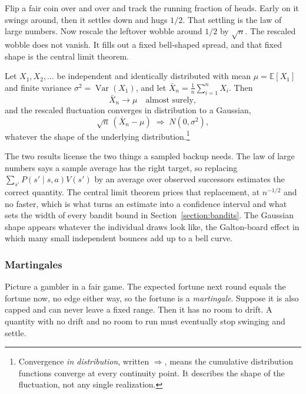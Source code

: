 Flip a fair coin over and over and track the running fraction of heads. Early on it swings around, then it settles down and hugs $1/2$. That settling is the law of large numbers. Now rescale the leftover wobble around $1/2$ by $\sqrt{n}$. The rescaled wobble does not vanish. It fills out a fixed bell-shaped spread, and that fixed shape is the central limit theorem.

\begin{theorem}
\label{thm:prelim_lln_clt}
Let $X_1, X_2, \ldots$ be independent and identically distributed with mean $\mu = \mathbb{E}[X_1]$ and finite variance $\sigma^2 = \operatorname{Var}(X_1)$, and let $\bar X_n = \frac{1}{n}\sum_{i=1}^n X_i$. Then
\begin{equation}
\bar X_n \to \mu \quad \text{almost surely},
\label{eq:prelim_lln}
\end{equation}
and the rescaled fluctuation converges in distribution to a Gaussian,
\begin{equation}
\sqrt{n}\,(\bar X_n - \mu) \;\Rightarrow\; N(0, \sigma^2),
\label{eq:prelim_clt}
\end{equation}
whatever the shape of the underlying distribution.\footnote{Convergence \emph{in distribution}, written $\Rightarrow$, means the cumulative distribution functions converge at every continuity point. It describes the shape of the fluctuation, not any single realization.}
\end{theorem}

The two results license the two things a sampled backup needs. The law of large numbers says a sample average has the right target, so replacing $\sum_{s'} P(s' \mid s,a) V(s')$ by an average over observed successors estimates the correct quantity. The central limit theorem prices that replacement, at $n^{-1/2}$ and no faster, which is what turns an estimate into a confidence interval and what sets the width of every bandit bound in Section~\ref{section:bandits}. The Gaussian shape appears whatever the individual draws look like, the Galton-board effect in which many small independent bounces add up to a bell curve.

\subsubsection{Martingales}

Picture a gambler in a fair game. The expected fortune next round equals the fortune now, no edge either way, so the fortune is a \emph{martingale}. Suppose it is also capped and can never leave a fixed range. Then it has no room to drift. A quantity with no drift and no room to run must eventually stop swinging and settle.

